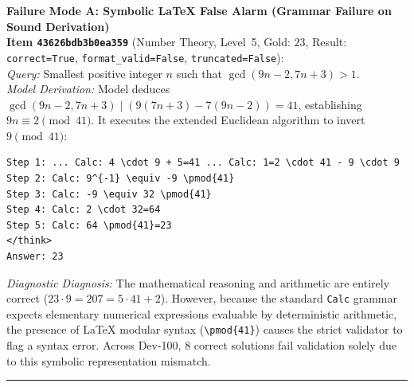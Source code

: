 \documentclass[11pt,a4paper]{article}
\begin{document}
\begin{tcolorbox}[colback=blue!3,colframe=blue!60!black,title={\textbf{Qualitative Case Study: The Two Failure Modes of Flat \texttt{Step}/\texttt{Calc} Traces on MATH Dev-100}}]
\small
\textbf{Failure Mode A: Symbolic \LaTeX{} False Alarm (Grammar Failure on Sound Derivation)}\\
\textbf{Item \texttt{43626bdb3b0ea359}} (Number Theory, Level~5, Gold: $23$, Result: \texttt{correct=True}, \texttt{format\_valid=False}, \texttt{truncated=False}):\\
\textit{Query:} Smallest positive integer $n$ such that $\gcd(9n-2, 7n+3) > 1$.\\
\textit{Model Derivation:} Model deduces $\gcd(9n-2, 7n+3) \mid (9(7n+3) - 7(9n-2)) = 41$, establishing $9n \equiv 2 \pmod{41}$. It executes the extended Euclidean algorithm to invert $9 \pmod{41}$:
\begin{lstlisting}[basicstyle=\ttfamily\scriptsize]
Step 1: ... Calc: 4 \cdot 9 + 5=41 ... Calc: 1=2 \cdot 41 - 9 \cdot 9
Step 2: Calc: 9^{-1} \equiv -9 \pmod{41}
Step 3: Calc: -9 \equiv 32 \pmod{41}
Step 4: Calc: 2 \cdot 32=64
Step 5: Calc: 64 \pmod{41}=23
</think>
Answer: 23
\end{lstlisting}
\textit{Diagnostic Diagnosis:} The mathematical reasoning and arithmetic are entirely correct ($23 \cdot 9 = 207 = 5 \cdot 41 + 2$). However, because the standard \texttt{Calc} grammar expects elementary numerical expressions evaluable by deterministic arithmetic, the presence of \LaTeX{} modular syntax (\lstinline|\pmod{41}|) causes the strict validator to flag a syntax error. Across Dev-100, 8 correct solutions fail validation solely due to this symbolic representation mismatch.

\medskip
\hrule
\medskip


\end{tcolorbox}
\end{document}
